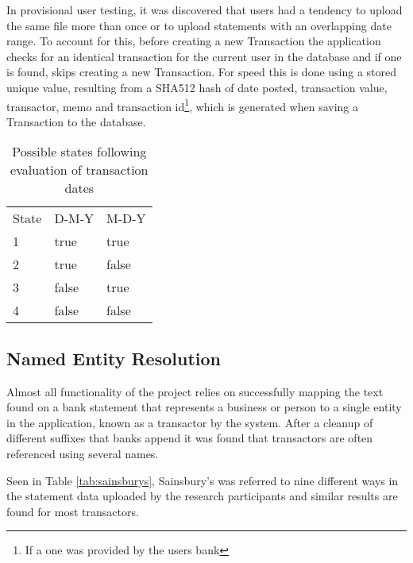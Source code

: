 In provisional user testing, it was discovered that users had a tendency to upload the same file more than once or to upload statements with an overlapping date range. To account for this, before creating a new Transaction the application checks for an identical transaction for the current user in the database and if one is found, skips creating a new Transaction. For speed this is done using a stored unique value, resulting from a SHA512 hash of date posted, transaction value, transactor, memo and transaction id\footnote{If a one was provided by the users bank}, which is generated when saving a Transaction to the database.

\begin{table}[h]
\centering
\begin{tabular}{lll}
State & D-M-Y & M-D-Y \\
1     & true  & true  \\
2     & true  & false \\
3     & false & true  \\
4     & false & false
\end{tabular}
\caption{Possible states following evaluation of transaction dates}
\label{table:datestates}
\end{table}

% 

\subsection{Named Entity Resolution}
Almost all functionality of the project relies on successfully mapping the text found on a bank statement that represents a business or person to a single entity in the application, known as a \gls{transactor} by the system. After a cleanup of different suffixes that banks append it was found that \glspl{transactor} are often referenced using several names.

Seen in Table \ref{tab:sainsburys}, Sainsbury's was referred to nine different ways in the statement data uploaded by the research participants and similar results are found for most \glspl{transactor}.

